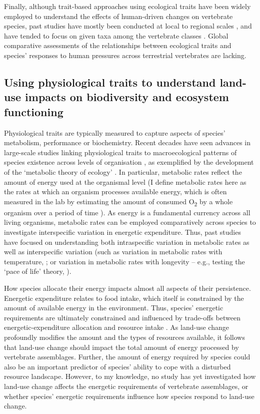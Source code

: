 Finally, although trait-based approaches using ecological traits have been widely employed to understand the effects of human-driven changes on vertebrate species, past studies have mostly been conducted at local to regional scales \citep{Davison2021}, and have tended to focus on given taxa among the vertebrate classes \citep{Hevia2017}. Global comparative assessments of the relationships between ecological traits and species' responses to human pressures across terrestrial vertebrates are lacking.


\subsection{Using physiological traits to understand  land-use impacts on biodiversity and ecosystem functioning}

Physiological traits are typically measured to capture aspects of species' metabolism, performance or biochemistry. Recent decades have seen advances in large-scale studies linking physiological traits to macroecological patterns of species existence across levels of organisation \citep{Chown2004, Burger2021}, as exemplified by the development of the `metabolic theory of ecology' \citep{Gillooly2001a, Brown2004a}. In particular, metabolic rates reflect the amount of energy used at the organismal level (I define metabolic rates here as the rates at which an organism processes available energy, which is often measured in the lab by estimating the amount of consumed O\textsubscript{2} by a whole organism over a period of time \citep{Sadowska2015, Auer2017}). As energy is a fundamental currency across all living organisms, metabolic rates can be employed comparatively across species to investigate interspecific variation in energetic expenditure. Thus, past studies have focused on understanding both intraspecific variation in metabolic rates \citep{Burton2011, Auer2017} as well as interspecific variation (such as variation in metabolic rates with temperature, \citet{Clarke2004a}; or variation in metabolic rates with longevity -- e.g., testing the `pace of life' theory, \citet{Stark2020}).

How species allocate their energy impacts almost all aspects of their persistence. Energetic expenditure relates to food intake, which itself is constrained by the amount of available energy in the environment. Thus, species' energetic requirements are ultimately constrained and influenced by trade-offs between energetic-expenditure allocation and resource intake \citep{Auer2020}. As land-use change profoundly modifies the amount and the types of resources available, it follows that land-use change should impact the total amount of energy processed by vertebrate assemblages. Further, the amount of energy required by species could also be an important predictor of species' ability to cope with a disturbed resource landscape. However, to my knowledge, no study has yet investigated how land-use change affects the energetic requirements of vertebrate assemblages, or whether species' energetic requirements influence how species respond to land-use change.


